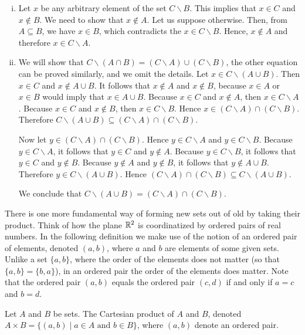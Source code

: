 \documentclass[a4paper,english,12pt]{article}
\begin{document}
\begin{enumerate} [i)]
\item Let $x$ be any arbitrary element of the set $C \backslash B$. This implies that $x \in C$ and 
$x \notin B$. We need to show that $x \notin A$. Let us suppose otherwise. Then, from $A \subseteq B$, we have $x \in B$, which contradicts the $x \in C \backslash B$. Hence, $x \notin A$ and therefore $x \in C \backslash A$.     

\item We will show that $C \backslash (A \cap B) = (C \backslash A) \cup (C \backslash B)$, the other equation can be proved similarly, and we omit the details. Let $x \in C \backslash(A \cup B)$. 
Then $x \in C$ and $x \notin A \cup B$. It follows that $x \notin A$ and $x \notin  B$, because 
$x \in A$ or $x \in B$ would imply that $x \in A \cup B$. Because $x \in C$ and $x \notin A$, then $x \in C \backslash A$. Because $x \in C$ and $x \notin B$, then $x \in C \backslash B$. Hence $x \in (C \backslash A)\cap(C \backslash B)$. Therefore $C \backslash (A \cup B) \subseteq  (C \backslash A)\cap (C \backslash B)$.

Now let $y \in (C \backslash A) \cap (C \backslash B)$. Hence $y \in C \backslash A$ and $y \in C \backslash B$. Because $y \in C \backslash A$, it follows that $y \in C$ and $y \notin A$. Because $y \in C \backslash B$, it follows that $y \in C$ and $y \notin B$.
Because $y \notin A$ and $y \notin B$, it follows that $y \notin A \cup B$. Therefore $y  \in C \backslash (A \cup B)$. Hence $(C \backslash A) \cap (C \backslash B)  \subseteq C \backslash (A \cup B)$.

We conclude that $C \backslash (A \cup B) = (C \backslash A) \cap (C \backslash B)$.
 
\end{enumerate}


There is one more fundamental way of forming new sets out of old by taking their product. Think of how the plane $\mathbb{R}^{2}$ is coordinatized by ordered pairs of real
numbers. In the following definition we make use of the notion of an ordered pair of elements, denoted $\left(a, b \right)$, where $a$ and $b$ are elements of
some given sets. Unlike a set $\{a, b\}$, where the order of the elements does not matter (so that $\{a, b\} = \{b, a\}$), in an ordered pair the order of the 
elements does matter. Note that the ordered pair $\left(a, b \right)$ equals the ordered pair $\left(c, d \right)$ if and only if $a = c$ and $b = d$. 

\begin{defn}
Let $A$ and $B$ be sets. The Cartesian product of $A$ and $B$, denoted 
$A \times B = \{ (a, b) \; | \; a \in A \text{ and } b \in B \}$, 
where $(a, b)$ denote an ordered pair.
\end{defn}
\end{document}
